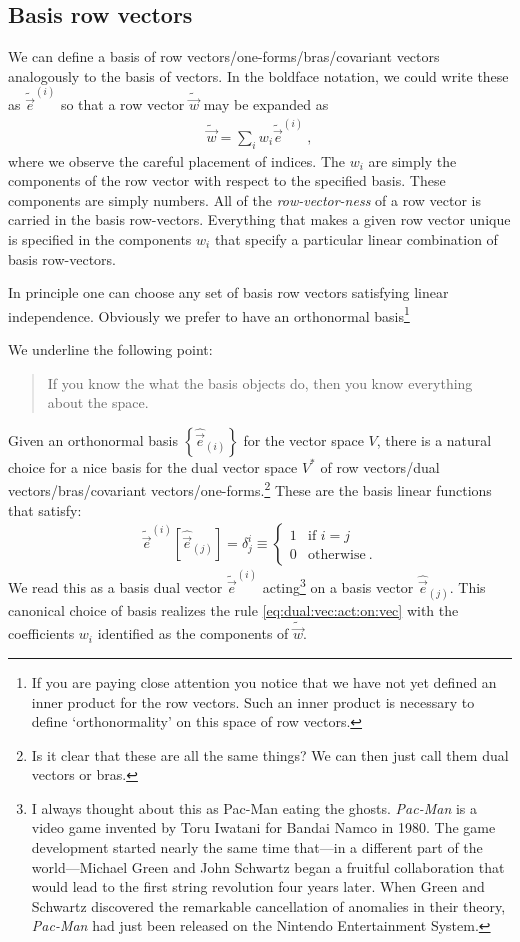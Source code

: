 \documentclass[
  11pt,
	colorful,
	raggedright,
]{tufte-style-thesis-flip}
\begin{document}
\subsection{Basis row vectors}

We can define a basis of row vectors/one-forms/bras/covariant vectors analogously to the basis of vectors. In the boldface notation, we could write these as $\tilde{\vec{e}}^{(i)}$ so that a row vector $\tilde{\vec w}$ may be expanded as
\begin{align}
 \tilde{\vec w} = \sum_i w_i \tilde{\vec{e}}^{(i)} \ ,
\end{align}
where we observe the careful placement of indices. The $w_i$ are simply the components of the row vector with respect to the specified basis. These components are simply numbers. All of the \emph{row-vector-ness} of a row vector is carried in the basis row-vectors. Everything that makes a given row vector unique is specified in the components $w_i$ that specify a particular linear combination of basis row-vectors.

In principle one can choose any set of basis row vectors satisfying linear independence. Obviously we prefer to have an orthonormal basis\footnote{If you are paying close attention you notice that we have not yet defined an inner product for the row vectors. Such an inner product is necessary to define `orthonormality' on this space of row vectors.}

We underline the following point:
\begin{quote}
If you know the what the basis objects do, then you know everything about the space.
\end{quote}
Given an orthonormal basis $\left\{\hat{\vec{e}}_{(i)}\right\}$ for the vector space $V$, there is a natural choice for a nice basis for the dual vector space $V^*$ of row vectors/dual vectors/bras/covariant vectors/one-forms.\footnote{Is it clear that these are all the same things? We can then just call them dual vectors or bras.} These are the basis linear functions that satisfy:
\begin{align}
  \tilde{\vec e}^{(i)} \left[\hat{\vec{e}}_{(j)}\right] = \delta^i_j
  \equiv
  \begin{cases}
  1 &\text{if } i=j\\
  0 &\text{otherwise} \ .
  \end{cases}
  \label{eq:canonical:dual:basis}
\end{align}
We read this as a basis dual vector $\tilde{\vec e}^{(i)}$ acting\footnote{I always thought about this as Pac-Man eating the ghosts. \emph{Pac-Man} is a video game invented by Toru Iwatani for Bandai Namco in 1980. The game development started nearly the same time that---in a different part of the world---Michael Green and John Schwartz began a fruitful collaboration that would lead to the first string revolution four years later. When Green and Schwartz discovered the remarkable cancellation of anomalies in their theory, \emph{Pac-Man} had just been released on the Nintendo Entertainment System.} on a basis vector $\hat{\vec{e}}_{(j)}$.
This canonical choice of basis realizes the rule \eqref{eq:dual:vec:act:on:vec} with the coefficients $w_i$ identified as the components of $\tilde{\vec w}$.
\end{document}
